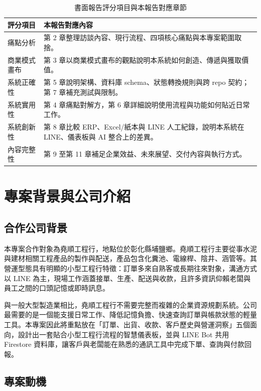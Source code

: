\documentclass[12pt,a4paper,UTF8,fontset=none]{ctexart}
\begin{document}
\begin{table}[H]
  \centering
  \caption{書面報告評分項目與本報告對應章節}
  \begin{tabularx}{\textwidth}{L{3.2cm}Y}
    \toprule
    評分項目 & 本報告對應內容 \\
    \midrule
    痛點分析 & 第 2 章整理訪談內容、現行流程、四項核心痛點與本專案範圍取捨。 \\
    商業模式畫布 & 第 3 章以商業模式畫布的觀點說明本系統如何創造、傳遞與獲取價值。 \\
    系統正確性 & 第 5 章說明架構、資料庫 schema、狀態轉換規則與跨 repo 契約；第 7 章補充測試與限制。 \\
    系統實用性 & 第 4 章痛點對解方，第 6 章詳細說明使用流程與功能如何貼近日常工作。 \\
    系統創新性 & 第 8 章比較 ERP、Excel/紙本與 LINE 人工紀錄，說明本系統在 LINE、儀表板與 AI 整合上的差異。 \\
    內容完整性 & 第 9 至第 11 章補足企業效益、未來展望、交付內容與執行方式。 \\
    \bottomrule
  \end{tabularx}
\end{table}

\section{專案背景與公司介紹}

\subsection{合作公司背景}

本專案合作對象為堯順工程行，地點位於彰化縣埔鹽鄉。堯順工程行主要從事水泥與建材相關工程產品的製作與配送，產品包含化糞池、電線桿、陰井、涵管等。其營運型態具有明顯的小型工程行特徵：訂單多來自熟客或長期往來對象，溝通方式以 LINE 為主，現場工作涵蓋接單、生產、配送與收款，且許多資訊仰賴老闆與員工之間的口頭記憶或即時訊息。

與一般大型製造業相比，堯順工程行不需要完整而複雜的企業資源規劃系統。公司最需要的是一個能支援日常工作、降低記憶負擔、快速查詢訂單與帳款狀態的輕量工具。本專案因此將重點放在「訂單、出貨、收款、客戶歷史與營運洞察」五個面向，設計出一套貼合小型工程行流程的智慧儀表板，並與 LINE Bot 共用 Firestore 資料庫，讓客戶與老闆能在熟悉的通訊工具中完成下單、查詢與付款回報。

\subsection{專案動機}
\end{document}
